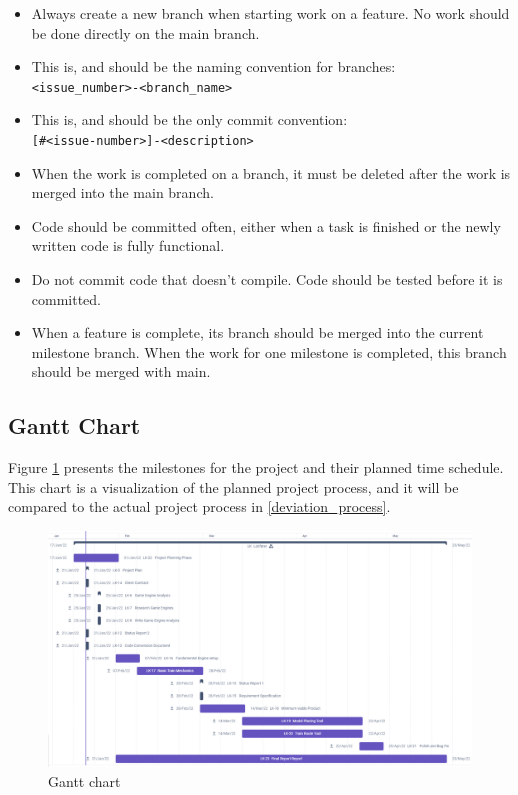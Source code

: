 \begin{itemize}
\item Always create a new branch when starting work on a feature. No work should be done directly on the main branch.
\item This is, and should be the naming convention for branches: \\
\verb|<issue_number>-<branch_name>|
\item This is, and should be the only commit convention: \\
\verb|[#<issue-number>]-<description>|
\item When the work is completed on a branch, it must be deleted after the work is merged into the main branch.
\item Code should be committed often, either when a task is finished or the newly written code is fully functional.
\item Do not commit code that doesn't compile. Code should be tested before it is committed.
\item When a feature is complete, its branch should be merged into the current milestone branch. When the work for one milestone is completed, this branch should be merged with main. %



\end{itemize} 



\subsection{Gantt Chart}

Figure \ref{gannt_chart} presents the milestones for the project and their planned time schedule. This chart is a visualization of the planned project process, and it will be compared to the actual project process in \ref{deviation_process}. %

\begin{figure}[H]
\centerline{\includegraphics[width=1.0\textwidth]{figures/Gantt.png}}
\caption{Gantt chart}
\label{gannt_chart}
\end{figure} 




